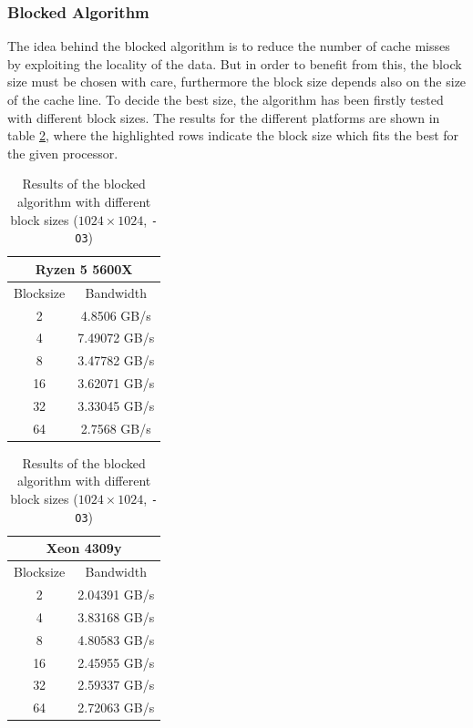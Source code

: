 \documentclass{article}
\begin{document}
\subsubsection{Blocked Algorithm}
The idea behind the blocked algorithm is to reduce the number of cache misses by exploiting the locality of the data. But in order to benefit from this, the block
size must be chosen with care, furthermore the block size depends also on the size of the cache line. To decide the best size, the algorithm has been firstly
tested with different block sizes. The results for the different platforms are shown in table \ref{tab:blocked_results}, where the highlighted rows indicate the 
block size which fits the best for the given processor.
\begin{table}
    \centering
    \begin{tabular}{|c|c|}
        \hline
        \multicolumn{2}{|c|}{\textbf{Ryzen 5 5600X}} \\
        \hline
        Blocksize & Bandwidth \\ \hline
        2         & 4.8506 GB/s \\ \hline
        \rowcolor{LightYellow}
        4         & 7.49072 GB/s \\ \hline
        8         & 3.47782 GB/s \\ \hline
        16        & 3.62071 GB/s \\ \hline
        32        & 3.33045 GB/s \\ \hline
        64        & 2.7568 GB/s \\ \hline
    \end{tabular}
    \hspace{2em}
    \begin{tabular}{|c|c|}
        \hline
        \multicolumn{2}{|c|}{\textbf{Xeon 4309y}} \\
        \hline
        Blocksize & Bandwidth \\ \hline
        2         & 2.04391 GB/s \\ \hline
        4         & 3.83168 GB/s \\ \hline
        \rowcolor{LightYellow}
        8         & 4.80583 GB/s \\ \hline
        16        & 2.45955 GB/s \\ \hline
        32        & 2.59337 GB/s \\ \hline
        64        & 2.72063 GB/s \\ \hline
    \end{tabular}
    \caption{Results of the blocked algorithm with different block sizes ($1024 \times 1024$, \texttt{-O3})}
    \label{tab:blocked_results}
\end{table}
\end{document}
